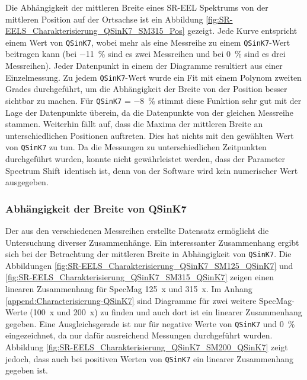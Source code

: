 \documentclass[
	paper=a4,				%
	twoside=true,			%
	BCOR=6mm,				%
	fontsize=12pt,			%
	pagesize=auto,			%
	numbers=noenddot,		%
	bibliography=totoc,		%
	draft=false
]{scrartcl}
\begin{document}
Die Abhängigkeit der mittleren Breite eines SR-EEL Spektrums von der mittleren Position auf der Ortsachse ist ein Abbildung \ref{fig:SR-EELS_Charakterisierung_QSinK7_SM315_Pos} gezeigt. Jede Kurve entspricht einem Wert von \texttt{QSinK7}, wobei mehr als eine Messreihe zu einem \texttt{QSinK7}-Wert beitragen kann (bei \SI{-11}{\percent} sind es zwei Messreihen und bei \SI{0}{\percent} sind es drei Messreihen). Jeder Datenpunkt in einem der Diagramme resultiert aus einer Einzelmessung. Zu jedem \texttt{QSinK7}-Wert wurde ein Fit mit einem Polynom zweiten Grades durchgeführt, um die Abhängigkeit der Breite von der Position besser sichtbar zu machen. Für \texttt{QSinK7} = \SI{-8}{\percent} stimmt diese Funktion sehr gut mit der Lage der Datenpunkte überein, da die Datenpunkte von der gleichen Messreihe stammen. Weiterhin fällt auf, dass die Maxima der mittleren Breite an unterschiedlichen Positionen auftreten. Dies hat nichts mit den gewählten Wert von \texttt{QSinK7} zu tun. Da die Messungen zu unterschiedlichen Zeitpunkten durchgeführt wurden, konnte nicht gewährleistet werden, dass der Parameter \glqq Spectrum Shift\grqq\ identisch ist, denn von der Software wird kein numerischer Wert ausgegeben.


\subsubsection{Abhängigkeit der Breite von QSinK7} \label{append:Characterisierung-Width-vs-QSinK7}

Der aus den verschiedenen Messreihen erstellte Datensatz ermöglicht die Untersuchung diverser Zusammenhänge. Ein interessanter Zusammenhang ergibt sich bei der Betrachtung der mittleren Breite in Abhängigkeit von \texttt{QSinK7}. Die Abbildungen \ref{fig:SR-EELS_Charakterisierung_QSinK7_SM125_QSinK7} und \ref{fig:SR-EELS_Charakterisierung_QSinK7_SM315_QSinK7} zeigen einen linearen Zusammenhang für SpecMag \SI{125}{x} und \SI{315}{x}. Im Anhang \ref{append:Characterisierung-QSinK7} sind Diagramme für zwei weitere SpecMag-Werte (\SI{100}{x} und \SI{200}{x}) zu finden und auch dort ist ein linearer Zusammenhang gegeben. Eine Ausgleichsgerade ist nur für negative Werte von \texttt{QSinK7} und \SI{0}{\percent} eingezeichnet, da nur dafür ausreichend Messungen durchgeführt wurden. Abbildung \ref{fig:SR-EELS_Charakterisierung_QSinK7_SM200_QSinK7} zeigt jedoch, dass auch bei positiven Werten von \texttt{QSinK7} ein linearer Zusammenhang gegeben ist.
\end{document}
